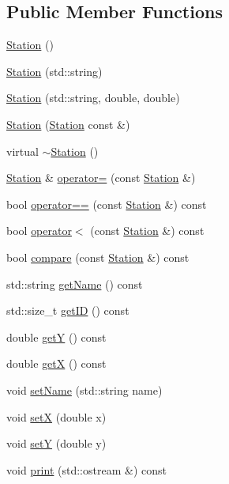 \subsection*{Public Member Functions}
\begin{DoxyCompactItemize}
\item 
\mbox{\hyperlink{class_station_a73d335726aad1d844d81cda6d9fd74e6}{Station}} ()
\item 
\mbox{\hyperlink{class_station_aeeba2cddaa328abff85cebfa5898b988}{Station}} (std\+::string)
\item 
\mbox{\hyperlink{class_station_a93320869206d6fdb35c6b314b03b9dd6}{Station}} (std\+::string, double, double)
\item 
\mbox{\hyperlink{class_station_aadb65bfb700ad2aee7dd4e7f62e40613}{Station}} (\mbox{\hyperlink{class_station}{Station}} const \&)
\item 
virtual \mbox{\hyperlink{class_station_a00434e79e8ee7f4ebd6d3b631dde5ac0}{$\sim$\+Station}} ()
\item 
\mbox{\hyperlink{class_station}{Station}} \& \mbox{\hyperlink{class_station_abaf887b87628c2bcd7e0af8626a4a1a4}{operator=}} (const \mbox{\hyperlink{class_station}{Station}} \&)
\item 
bool \mbox{\hyperlink{class_station_adae415f0267986c0056899ff4104cd5e}{operator==}} (const \mbox{\hyperlink{class_station}{Station}} \&) const
\item 
bool \mbox{\hyperlink{class_station_ad49b12012cb13c9f806587d9aa4c6fc9}{operator$<$}} (const \mbox{\hyperlink{class_station}{Station}} \&) const
\item 
bool \mbox{\hyperlink{class_station_a92f492a4766127e6ffbe993f0873708c}{compare}} (const \mbox{\hyperlink{class_station}{Station}} \&) const
\item 
std\+::string \mbox{\hyperlink{class_station_ac823ae175ec0e2baff462ed9612c7bae}{get\+Name}} () const
\item 
std\+::size\+\_\+t \mbox{\hyperlink{class_station_a69be6c90e4613e4166651ff6e67cfba2}{get\+ID}} () const
\item 
double \mbox{\hyperlink{class_station_aadddb2db193456d14bae16dbf2b8259f}{getY}} () const
\item 
double \mbox{\hyperlink{class_station_aa954dcd5d8f77ac9b91021b1e9c07735}{getX}} () const
\item 
void \mbox{\hyperlink{class_station_ad06d1756f0034a3f73ee1fe2993f87b9}{set\+Name}} (std\+::string name)
\item 
void \mbox{\hyperlink{class_station_ac9a83dadcfdcb36f477fed3c4586ff13}{setX}} (double x)
\item 
void \mbox{\hyperlink{class_station_a65a1d9f1121dc20515585594505e3a2e}{setY}} (double y)
\item 
void \mbox{\hyperlink{class_station_a1dfee264d3f636388b032675acb1302a}{print}} (std\+::ostream \&) const
\end{DoxyCompactItemize}
